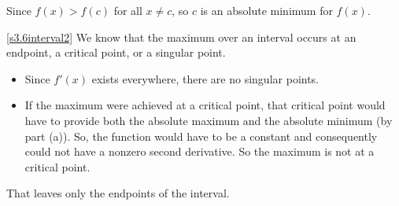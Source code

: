 \begin{answer}
\begin{center}\end{center}
 Since $f(x)>f(c)$ for
all $x\ne c$, so $c$ is an absolute minimum for $f(x)$.

\eqref{s3.6interval2}
We know that the maximum over an interval occurs at an endpoint,
a critical point, or a singular point.
\begin{itemize}
\item  Since $f'(x)$ exists everywhere, there are no singular points.
\item If the maximum were achieved at a critical point, that critical point would
have to provide both the absolute maximum and the absolute minimum (by part (a)).
So, the function would have to be a constant and consequently could not have
a nonzero second derivative. So the maximum is not at a critical point.
\end{itemize}
That leaves only the endpoints of the interval.
\end{answer}
